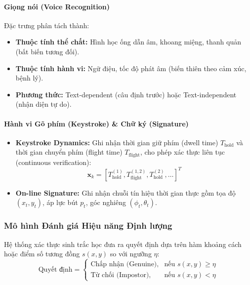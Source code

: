 \paragraph{Giọng nói (Voice Recognition)}
Đặc trưng phân tách thành:
\begin{itemize}
    \item \textbf{Thuộc tính thể chất:} Hình học ống dẫn âm, khoang miệng, thanh quản (bất biến tương đối).
    \item \textbf{Thuộc tính hành vi:} Ngữ điệu, tốc độ phát âm (biến thiên theo cảm xúc, bệnh lý).
    \item \textbf{Phương thức:} Text-dependent (câu định trước) hoặc Text-independent (nhận diện tự do).
\end{itemize}

\paragraph{Hành vi Gõ phím (Keystroke) \& Chữ ký (Signature)}
\begin{itemize}
    \item \textbf{Keystroke Dynamics:} Ghi nhận thời gian giữ phím (dwell time) $T_{\text{hold}}$ và thời gian chuyển phím (flight time) $T_{\text{flight}}$, cho phép xác thực liên tục (continuous verification):
    \begin{equation}
        \mathbf{x}_k = [T_{\text{hold}}^{(1)}, T_{\text{flight}}^{(1, 2)}, T_{\text{hold}}^{(2)}, \dots]^T
    \end{equation}
    \item \textbf{On-line Signature:} Ghi nhận chuỗi tín hiệu thời gian thực gồm tọa độ $(x_t, y_t)$, áp lực bút $p_t$, góc nghiêng $(\phi_t, \theta_t)$.
\end{itemize}

\subsubsection{Mô hình Đánh giá Hiệu năng Định lượng}

Hệ thống xác thực sinh trắc học đưa ra quyết định dựa trên hàm khoảng cách hoặc điểm số tương đồng $s(x, y)$ so với ngưỡng $\eta$:
\begin{equation}
    \text{Quyết định} = 
    \begin{cases}
        \text{Chấp nhận (Genuine)}, & \text{nếu } s(x, y) \ge \eta \\
        \text{Từ chối (Impostor)}, & \text{nếu } s(x, y) < \eta
    \end{cases}
\end{equation}

